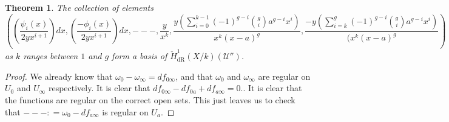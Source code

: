 \documentclass[draft, 11pt]{article} %
\theoremstyle{plain}
\newtheorem{thm}[defn]{Theorem}
\theoremstyle{remark}
\newcommand{\cU}{{\mathcal U}}
\newcommand{\cechderhamhone}{\check{H}_{\text {dR}}^1(X/k)}
\begin{document}
\begin{thm}
The collection of elements
\begin{equation}
\left( \left( \frac{\psi_i(x)}{2yx^{i+1}}\right) dx,  \left(\frac{-\phi_i(x)}{2yx^{i+1}}\right) dx, ---, \frac{y}{x^k}, \frac{y\left( \sum_{i=0}^{k-1} (-1)^{g-i} \binom{g}{i}a^{g-i}x^i \right)}{x^k(x-a)^g}, \frac{-y\left( \sum_{i=k}^g (-1)^{g-i} \binom{g}{i} a^{g-i}x^i \right)}{(x^k(x-a)^g} \right)
\end{equation}
as $k$ ranges between $1$ and $g$ form a basis of $\cechderhamhone(\cU'')$.
\end{thm}
\begin{proof}
We already know that $\omega_{0} - \omega_{\infty} = df_{0 \infty}$, and that $\omega_0$ and $\omega_\infty$ are regular on $U_0$ and $U_\infty$ respectively.
It is clear that $df_{0\infty} - df_{0 a} + df_{a \infty} = 0$..
It is clear that the functions are regular on the correct open sets. 
This just leaves us to check that $--- : = \omega_{0} - df_{a \infty}$ is regular on $U_a$.
\end{proof}


\end{document}
